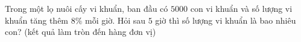 \begin{ex}
Trong một lọ nuôi cấy vi khuẩn, ban đầu có $5000$ con vi khuẩn và số lượng vi khuẩn tăng thêm $8\%$ mỗi giờ. Hỏi sau $5$ giờ thì số lượng vi khuẩn là bao nhiêu con? (kết quả làm tròn đến hàng đơn vị)
\end{ex}
